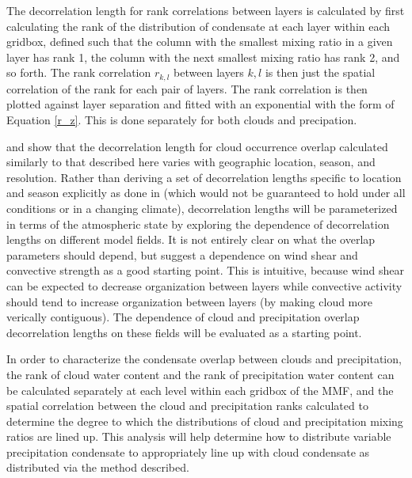 \documentclass[letter]{article}
\begin{document}
The decorrelation length for rank correlations between layers is calculated by first calculating the rank of the distribution of condensate at each layer within each gridbox, defined such that the column with the smallest mixing ratio in a given layer has rank 1, the column with the next smallest mixing ratio has rank 2, and so forth. The rank correlation $r_{k,l}$ between layers $k,l$ is then just the spatial correlation of the rank for each pair of layers. The rank correlation is then plotted against layer separation and fitted with an exponential with the form of Equation \ref{r_z}. This is done separately for both clouds and precipation.

\cite{mace_and_benson-troth_2002} and \cite{barker_2008} show that the decorrelation length for cloud occurrence overlap calculated similarly to that described here varies with geographic location, season, and resolution. Rather than deriving a set of decorrelation lengths specific to location and season explicitly as done in \cite{oreopoulos_et_al_2012} (which would not be guaranteed to hold under all conditions or in a changing climate), decorrelation lengths will be parameterized in terms of the atmospheric state by exploring the dependence of decorrelation lengths on different model fields. It is not entirely clear on what the overlap parameters should depend, but \cite{pincus_et_al_2005} suggest a dependence on wind shear and convective strength as a good starting point. This is intuitive, because wind shear can be expected to decrease organization between layers while convective activity should tend to increase organization between layers (by making cloud more verically contiguous). The dependence of cloud and precipitation overlap decorrelation lengths on these fields will be evaluated as a starting point.

In order to characterize the condensate overlap between clouds and precipitation, the rank of cloud water content and the rank of precipitation water content can be calculated separately at each level within each gridbox of the MMF, and the spatial correlation between the cloud and precipitation ranks calculated to determine the degree to which the distributions of cloud and precipitation mixing ratios are lined up. This analysis will help determine how to distribute variable precipitation condensate to appropriately line up with cloud condensate as distributed via the \cite{raisanen_et_al_2004} method described.
\end{document}
